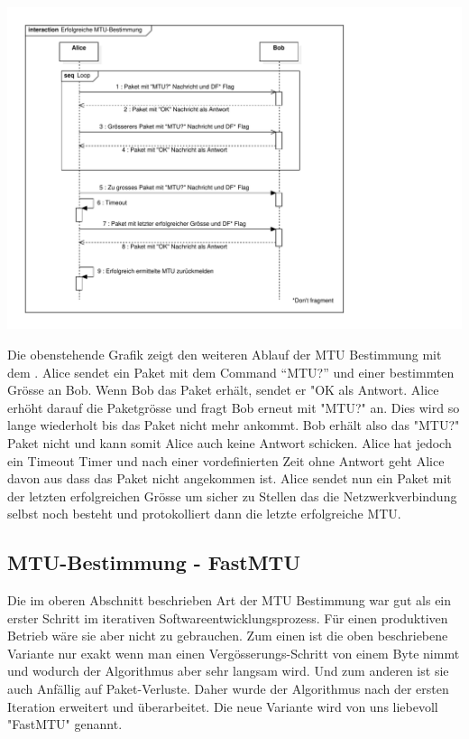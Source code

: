 \includegraphics[trim=10 10 200 10,clip,width=\textwidth]{mainpart/implementation/img/MTUBestimmungErfolgreich}

Die obenstehende Grafik zeigt den weiteren Ablauf der \acs{MTU} Bestimmung mit dem \tool. Alice sendet ein Paket mit dem Command \enquote{MTU?} und einer bestimmten Grösse an Bob. Wenn Bob das Paket erhält, sendet er "OK als Antwort. Alice erhöht darauf die Paketgrösse und fragt Bob erneut mit "MTU?" an. Dies wird so lange wiederholt bis das Paket nicht mehr ankommt. Bob erhält also das "MTU?" Paket nicht und kann somit Alice auch keine Antwort schicken. Alice hat jedoch ein Timeout Timer und nach einer vordefinierten Zeit ohne Antwort geht Alice davon aus dass das Paket nicht angekommen ist. Alice sendet nun ein Paket mit der letzten erfolgreichen Grösse um sicher zu Stellen das die Netzwerkverbindung selbst noch besteht und protokolliert dann die letzte erfolgreiche \acs{MTU}.

\subsection{MTU-Bestimmung - FastMTU}
Die im oberen Abschnitt beschrieben Art der \acs{MTU} Bestimmung war gut als ein erster Schritt im iterativen Softwareentwicklungsprozess. Für einen produktiven Betrieb wäre sie aber nicht zu gebrauchen. Zum einen ist die oben beschriebene Variante nur exakt wenn man einen Vergösserungs-Schritt von einem Byte nimmt und wodurch der Algorithmus aber sehr langsam wird. Und zum anderen ist sie auch Anfällig auf Paket-Verluste.
Daher wurde der Algorithmus nach der ersten Iteration erweitert und überarbeitet. Die neue Variante wird von uns liebevoll "FastMTU" genannt.

